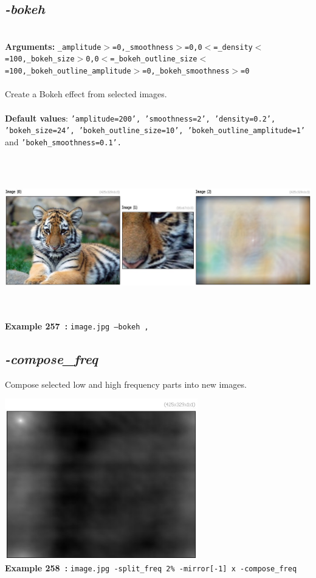 \documentclass[a4paper,11pt,twoside]{book}
\begin{document}
\subsection{\emph{-bokeh} }\vspace*{-0.5em}
~\\\textbf{Arguments: } 
{\small \texttt{\_amplitude$>$=0,\_smoothness$>$=0,0$<$=\_density$<$=100,\_bokeh\_size$>$0,0$<$=\_bokeh\_outline\_size$<$=100,\_bokeh\_outline\_amplitude$>$=0,\_bokeh\_smoothness$>$=0}}\\~\\
Create a Bokeh effect from selected images.
~\\~\\\textbf{Default values}: {\small \texttt{'amplitude=200', 'smoothness=2', 'density=0.2', 'bokeh\_size=24', 'bokeh\_outline\_size=10', 'bokeh\_outline\_amplitude=1'} and \texttt{'bokeh\_smoothness=0.1'.}}
\begin{center}\includegraphics[keepaspectratio=true,height=7cm,width=\textwidth]{img/gmic_def257.jpg}\\
{\footnotesize \textbf{Example 257~:} \texttt{image.jpg --bokeh ,}}
\end{center}

\subsection{\emph{-compose\_freq} }\vspace*{-0.5em}
Compose selected low and high frequency parts into new images.
\begin{center}\includegraphics[keepaspectratio=true,height=7cm,width=\textwidth]{img/gmic_def258.jpg}\\
{\footnotesize \textbf{Example 258~:} \texttt{image.jpg -split\_freq 2\% -mirror[-1] x -compose\_freq}}
\end{center}
\end{document}
